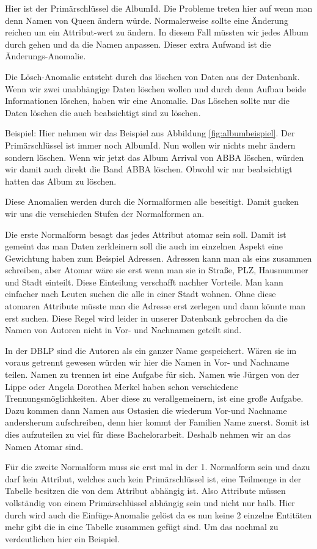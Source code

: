 Hier ist der Primärschlüssel die AlbumId. Die Probleme treten hier auf wenn man denn Namen von Queen ändern würde. Normalerweise sollte eine Änderung reichen um ein Attribut-wert zu ändern. In diesem Fall müssten wir jedes Album durch gehen und da die Namen anpassen. Dieser extra Aufwand ist die Änderungs-Anomalie.

Die Lösch-Anomalie entsteht durch das löschen von Daten aus der Datenbank. Wenn wir zwei unabhängige Daten löschen wollen und durch denn Aufbau beide Informationen löschen, haben wir eine Anomalie. Das Löschen sollte nur die Daten löschen die auch beabsichtigt sind zu löschen. 

Beispiel:
Hier nehmen wir das Beispiel aus Abbildung \ref{fig:albumbeispiel}. Der Primärschlüssel ist immer noch AlbumId. Nun wollen wir nichts mehr ändern sondern löschen. Wenn wir jetzt das Album Arrival von ABBA löschen, würden wir damit auch direkt die Band ABBA löschen. Obwohl wir nur beabsichtigt hatten das Album zu löschen.

Diese Anomalien werden durch die Normalformen alle beseitigt. Damit gucken wir uns die verschieden Stufen der Normalformen an.

Die erste Normalform besagt das jedes Attribut atomar sein soll. Damit ist gemeint das man Daten zerkleinern soll die auch im einzelnen Aspekt eine Gewichtung haben zum Beispiel Adressen. Adressen kann man als eins zusammen schreiben, aber Atomar wäre sie erst wenn man sie in Straße, PLZ, Hausnummer und Stadt einteilt. Diese Einteilung verschafft nachher Vorteile. Man kann einfacher nach Leuten suchen die alle in einer Stadt wohnen. Ohne diese atomaren Attribute müsste man die Adresse erst zerlegen und dann könnte man erst suchen. Diese Regel wird leider in unserer Datenbank gebrochen da die Namen von Autoren nicht in Vor- und Nachnamen geteilt sind. 

In der DBLP sind die Autoren als ein ganzer Name gespeichert. Wären sie im voraus getrennt gewesen würden wir hier die Namen in Vor- und Nachname teilen. Namen zu trennen ist eine Aufgabe für sich. Namen wie Jürgen von der Lippe oder Angela Dorothea Merkel haben schon verschiedene Trennungsmöglichkeiten. Aber diese zu verallgemeinern, ist eine große Aufgabe. Dazu kommen dann Namen aus Ostasien die wiederum Vor-und Nachname andersherum aufschreiben, denn hier kommt der Familien Name zuerst. Somit ist dies aufzuteilen zu viel für diese Bachelorarbeit. Deshalb nehmen wir an das Namen Atomar sind.

Für die zweite Normalform muss sie erst mal in der 1. Normalform sein und dazu darf kein Attribut, welches auch kein Primärschlüssel ist, eine Teilmenge in der Tabelle besitzen die von dem Attribut abhängig ist. Also Attribute müssen vollständig von einem Primärschlüssel abhängig sein und nicht nur halb. Hier durch wird auch die Einfüge-Anomalie gelöst da es nun keine 2 einzelne Entitäten mehr gibt die in eine Tabelle zusammen gefügt sind. Um das nochmal zu verdeutlichen hier ein Beispiel.

